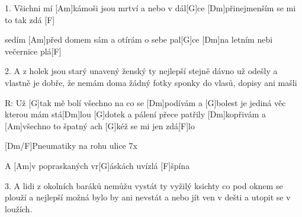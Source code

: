 
1. Všichni mí [Am]kámoši jsou mrtví a nebo v dál[G]ce
[Dm]přinejmenším se mi to tak zdá [F]

sedím [Am]před domem sám a otírám o sebe pal[G]ce
[Dm]na letním nebi večernice plá[F]


2. A z holek jsou starý unavený ženský
ty nejlepší stejně dávno už odešly
a vlastně je dobře, že nemám doma žádný fotky
sponky do vlasů, dopisy ani mašli

R: Už [G]tak mě bolí všechno na co se [Dm]podívám
a [G]bolest je jediná věc kterou mám stá[Dm]lou
[G]dotek a pálení přece patřily [Dm]kopřivám
a [Am]všechno to špatný ach [G]kéž se mi jen zdá[F]lo

[Dm/F]Pneumatiky
na rohu ulice 7x

A [Am]v popraskaných vr[G]\null áskách uvízlá [F]\null špína

3. A lidi z okolních baráků nemůžu vystát
ty vyžilý ksichty co pod oknem se plouží
a nejlepší možná bylo by ani nevstát
a nebo jít ven v dešti a utopit se v loužích.

